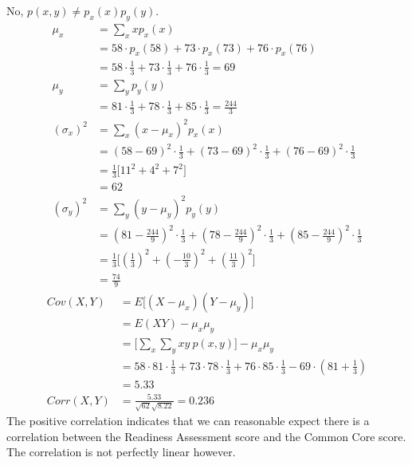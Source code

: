 \documentclass{math}
\begin{document}
No, \( p(x,y)\neq p_{x}(x)p_{y}(y) \).
\begin{align*}
  \mu_{x} &= \sum_{x}xp_{x}(x) \\
  &= 58\cdot p_{x}(58)+73\cdot p_{x}(73)+76\cdot p_{x}(76) \\
  &= 58\cdot\frac{1}{3}+73\cdot\frac{1}{3}+76\cdot\frac{1}{3} = 69 \\
  \mu_{y} &= \sum_{y}p_{y}(y) \\
  &= 81\cdot\frac{1}{3}+78\cdot\frac{1}{3}+85\cdot\frac{1}{3} = \frac{244}{3} \\
  (\sigma_{x})^{2} &= \sum_{x}(x-\mu_{x})^{2}p_{x}(x) \\
  &= (58-69)^{2}\cdot\frac{1}{3}+(73-69)^{2}\cdot\frac{1}{3}+
    (76-69)^{2}\cdot\frac{1}{3} \\
  &= \frac{1}{3}\big[11^{2}+4^{2}+7^{2}\big] \\
  &= 62 \\
  (\sigma_{y})^{2} &= \sum_{y}(y-\mu_{y})^{2}p_{y}(y) \\
  &= (81-\frac{244}{9})^{2}\cdot\frac{1}{3}+
    (78-\frac{244}{9})^{2}\cdot\frac{1}{3}+
    (85-\frac{244}{9})^{2}\cdot\frac{1}{3} \\
  &= \frac{1}{3}\big[
    (\frac{1}{3})^{2}+(-\frac{10}{3})^{2}+(\frac{11}{3})^{2}\big] \\
  &= \frac{74}{9}
\end{align*}
\begin{align*}
  Cov(X,Y) &= E\bigg[(X-\mu_{x})(Y-\mu_{y})\bigg] \\
  &= E(XY)-\mu_{x}\mu_{y} \\
  &= \bigg[\sum_{x}\sum_{y}xy\ p(x,y)\bigg]-\mu_{x}\mu_{y} \\
  &= 58\cdot81\cdot\frac{1}{3}+73\cdot78\cdot\frac{1}{3}+
    76\cdot85\cdot\frac{1}{3}-69\cdot(81+\frac{1}{3}) \\
  &= 5.33 \\
  Corr(X,Y) &= \frac{5.33}{\sqrt{62}\sqrt{8.22}} = 0.236
\end{align*}
The positive correlation indicates that we can reasonable expect there is a
correlation between the Readiness Assessment score and the Common Core score.
The correlation is not perfectly linear however.
\end{document}
